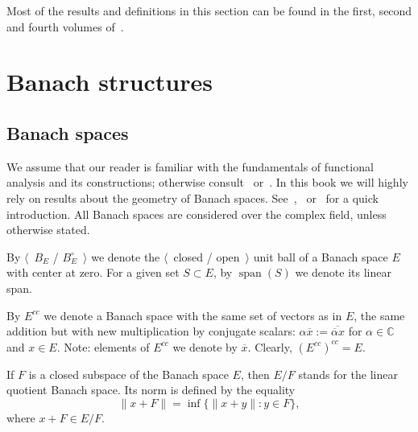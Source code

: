 Most of the results and definitions in this section can be found in the first,
second and fourth volumes of~\cite{FremMeasTh}.


\section{
  Banach structures}\label{SectionBanachStructures}


\subsection{
  Banach spaces}\label{SubSectionBanachSpaces}

We assume that our reader is familiar with the fundamentals of functional analysis
and its constructions; otherwise consult~\cite{HelLectAndExOnFuncAn}
or~\cite{ConwACoursInFuncAn}. In this book we will highly rely on results about
the geometry of Banach spaces.
See~\cite{CarothShortCourseBanSp},~\cite{KalAlbTopicsBanSpTh}
or~\cite{FabHabBanSpTh} for a quick introduction. All Banach spaces are
considered over the complex field, unless otherwise stated. 

By $\langle$~$B_E$ / $B_E^\circ$~$\rangle$ we denote the $\langle$~closed /
open~$\rangle$ unit ball of a Banach space $E$ with center at zero. For a given 
set $S\subset E$, by $\operatorname{span}(S)$ we denote its linear span. 

By $E^{cc}$ we denote a Banach space with the same set of vectors as in $E$, the
same addition but with new multiplication by conjugate scalars:  $\alpha
\overline{x}:=\overline{\overline{\alpha}x}$ for $\alpha\in\mathbb{C}$ 
and $x\in E$. Note: elements of $E^{cc}$ we denote by $\overline{x}$. Clearly,
${(E^{cc})}^{cc}=E$.

If $F$ is a closed subspace of the Banach space $E$, then $E/F$ stands for 
the linear quotient Banach space. Its norm is defined by the equality 
\[
\lVert x+F\rVert=\inf \{\lVert x+y\rVert: y\in F \},
\]
where $x+F\in E/F$.

